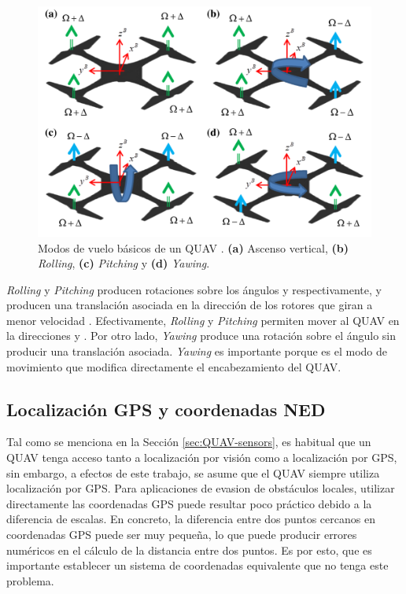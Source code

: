 \begin{figure}[H]
    \centering
    \includegraphics[scale=0.3]{partes/img/QUAV-modes.png}
    \caption[Modos de vuelo básicos de un QUAV.]{Modos de vuelo básicos de un QUAV \cite{multidrone2017review}. \textbf{(a)} Ascenso vertical, \textbf{(b)} \textit{Rolling}, \textbf{(c)} \textit{Pitching} y \textbf{(d)} \textit{Yawing}.} 
    \label{fig:QUAV-modes}
\end{figure}

\textit{Rolling} y \textit{Pitching} producen rotaciones sobre los ángulos \jim{\phi} y \jim{\theta} respectivamente, y producen una translación asociada en la dirección de los rotores que giran a menor velocidad \jim{\Omega - \Delta}. Efectivamente, \textit{Rolling} y \textit{Pitching} permiten mover al QUAV en la direcciones  y . Por otro lado, \textit{Yawing} produce una rotación sobre el ángulo \jim{\psi} sin producir una translación asociada. \textit{Yawing} es importante porque es el modo de movimiento que modifica directamente el encabezamiento del QUAV.

\subsection{Localización GPS y coordenadas NED}

Tal como se menciona en la Sección \ref{sec:QUAV-sensors}, es habitual que un QUAV tenga acceso tanto a localización por visión como a localización por GPS, sin embargo, a efectos de este trabajo, se asume que el QUAV siempre utiliza localización por GPS. Para aplicaciones de evasion de obstáculos locales, utilizar directamente las coordenadas GPS puede resultar poco práctico debido a la diferencia de escalas. En concreto, la diferencia entre dos puntos cercanos en coordenadas GPS puede ser muy pequeña, lo que puede producir errores numéricos en el cálculo de la distancia entre dos puntos. Es por esto, que es importante establecer un sistema de coordenadas equivalente que no tenga este problema.

